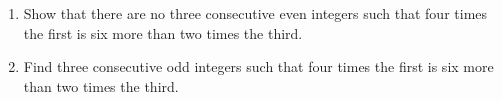 \begin{enumerate}
\item[(a)] Show that there are no three consecutive even integers such that four times the first is six more than two times the third.
\item[(b)] Find three consecutive odd integers such that four times the first is six more than two times the third.
\end{enumerate}
